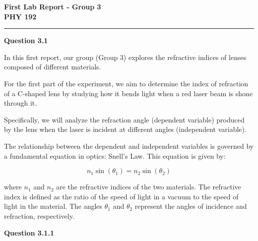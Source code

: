 \documentclass[a4paper,12pt]{article}
\begin{document}
\begin{center}
    \textbf{\Huge First Lab Report - Group 3}\\
    \vspace{0.2 cm}
    \textbf{\Huge PHY 192}\\
    \rule{\textwidth}{0.4pt}
\end{center}

\vspace{1cm}

\noindent \textbf{\LARGE Question 3.1}

\vspace{0.4cm}

In this first report, our group (Group 3) explores the refractive indices of lenses composed of different materials.

\vspace{0.3cm}

For the first part of the experiment, we aim to determine the index of refraction of a C-shaped lens by studying how it bends light when a red laser beam is shone through it.

\vspace{0.1cm}

Specifically, we will analyze the refraction angle (dependent variable) produced by the lens when the laser is incident at different angles (independent variable).

\vspace{0.1cm}

The relationship between the dependent and independent variables is governed by a fundamental equation in optics: Snell's Law. This equation is given by:

\begin{equation}
    n_1 \sin(\theta_1) = n_2 \sin(\theta_2)
\end{equation}

\vspace{0.1cm}

where $n_1$ and $n_2$ are the refractive indices of the two materials. The refractive index is defined as the ratio of the speed of light in a vacuum to the speed of light in the material. The angles $\theta_1$ and $\theta_2$ represent the angles of incidence and refraction, respectively.

\vspace{1cm}

\noindent \textbf{\LARGE Question 3.1.1}

\vspace{0.4cm}
\end{document}
